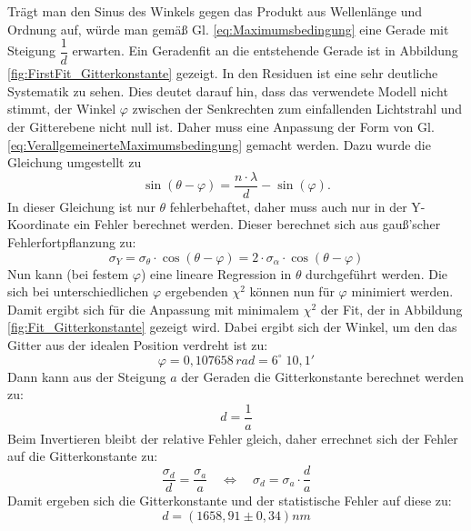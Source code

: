 \documentclass[12pt,a4paper]{article}
\begin{document}
Trägt man den Sinus des Winkels gegen das Produkt aus Wellenlänge und Ordnung auf, würde man gemäß Gl. \ref{eq:Maximumsbedingung} eine Gerade mit Steigung $\dfrac{1}{d}$ erwarten. Ein Geradenfit an die entstehende Gerade ist in Abbildung \ref{fig:FirstFit_Gitterkonstante} gezeigt. In den Residuen ist eine sehr deutliche Systematik zu sehen. Dies deutet darauf hin, dass das verwendete Modell nicht stimmt, der Winkel $\varphi$ zwischen der Senkrechten zum einfallenden Lichtstrahl und der Gitterebene nicht null ist. Daher muss eine Anpassung der Form von Gl. \ref{eq:VerallgemeinerteMaximumsbedingung} gemacht werden. Dazu wurde die Gleichung umgestellt zu
\begin{equation}
\sin (\theta - \varphi) = \dfrac{n \cdot \lambda}{d} - \sin (\varphi).
\end{equation}
In dieser Gleichung ist nur $\theta$ fehlerbehaftet, daher muss auch nur in der Y-Koordinate ein Fehler berechnet werden. Dieser berechnet sich aus gauß'scher Fehlerfortpflanzung zu:
\begin{equation}
\sigma _Y = \sigma _{\theta} \cdot \cos(\theta - \varphi) = 2 \cdot \sigma _{\alpha} \cdot \cos(\theta - \varphi)
\end{equation}
Nun kann (bei festem $\varphi$) eine lineare Regression in $\theta$ durchgeführt werden. Die sich bei unterschiedlichen $\varphi$ ergebenden $\chi ^2$ können nun für $\varphi$ minimiert werden. Damit ergibt sich für die Anpassung mit minimalem $\chi ^2$ der Fit, der in Abbildung \ref{fig:Fit_Gitterkonstante} gezeigt wird. Dabei ergibt sich der Winkel, um den das Gitter aus der idealen Position verdreht ist zu:
\begin{equation*}
\varphi = 0,107658 \, rad = 6 ^{\circ} \; 10,1'
\end{equation*}
Dann kann aus der Steigung $a$ der Geraden die Gitterkonstante berechnet werden zu:
\begin{equation}
d = \dfrac{1}{a}
\end{equation}
Beim Invertieren bleibt der relative Fehler gleich, daher errechnet sich der Fehler auf die Gitterkonstante zu:
\begin{equation}
\dfrac{\sigma_d}{d} = \dfrac{\sigma_a}{a} \quad \Leftrightarrow \quad \sigma_d = \sigma_a \cdot \dfrac{d}{a}
\end{equation}
Damit ergeben sich die Gitterkonstante und der statistische Fehler auf diese zu:
\begin{equation*}
d = (1658,91 \pm 0,34)nm
\end{equation*}
\end{document}
